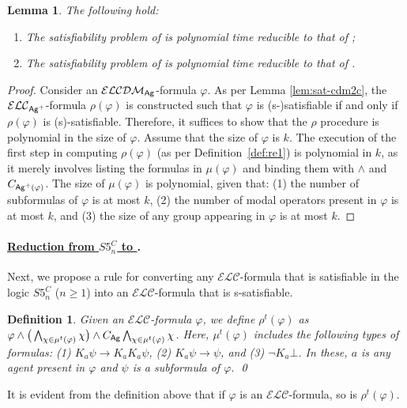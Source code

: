 \documentclass{article}
\newtheorem{definition}[theorem]{Definition}%
\newtheorem{lemma}[theorem]{Lemma}%
\newcommand{\ag}{\text{\normalfont\textsf{Ag}}\xspace}
\renewcommand{\phi}{\varphi}
\newcommand{\ra}{\rightarrow}
\newcommand{\langc}{\ensuremath{\mathcal{ELC}}\xspace}
\newcommand{\langcdm}{\ensuremath{\mathcal{ELCDM}}\xspace}
\newcommand{\lc}{\text{\normalfont ELC}\xspace}
\newcommand{\lcdm}{\text{\normalfont ELCDM}\xspace}
\newcommand{\lsc}{\text{\normalfont ELC$^s$}\xspace}
\newcommand{\lscdm}{\text{\normalfont ELCDM$^s$}\xspace}
\begin{document}
\begin{lemma}\label{lem:red-withc}
The following hold:
\begin{enumerate}
\item \label{it:red-cdm2c} The satisfiability problem of \lcdm is polynomial time reducible to that of \lc;
\item \label{it:red-scdm2sc} The satisfiability problem of \lscdm is polynomial time reducible to that of \lsc.
\end{enumerate}
\end{lemma}
\begin{proof}
Consider an $\langcdm_\ag$-formula $\phi$. As per Lemma \ref{lem:sat-cdm2c}, the $\langc_{\ag^+}$-formula $\rho(\phi)$ is constructed such that $\phi$ is (s-)satisfiable if and only if $\rho(\phi)$ is (s)-satisfiable. Therefore, it suffices to show that the $\rho$ procedure is polynomial in the size of $\phi$. Assume that the size of $\phi$ is $k$. The execution of the first step in computing $\rho(\phi)$ (as per Definition~\ref{def:re1}) is polynomial in $k$, as it merely involves listing the formulas in $\mu(\phi)$ and binding them with $\wedge$ and $C_{\ag^+(\phi)}$. The size of $\mu(\phi)$ is polynomial, given that: (1) the number of subformulas of $\phi$ is at most $k$, (2) the number of modal operators present in $\phi$ is at most $k$, and (3) the size of any group appearing in $\phi$ is at most $k$.
\end{proof}

\paragraph{\bfseries \underline{Reduction from $S5^C_n$ to \lsc}.}

Next, we propose a rule for converting any \langc-formula that is satisfiable in the logic $S5^C_n$ ($n \geq 1$) into an \langc-formula that is s-satisfiable.

\begin{definition}\label{def:rewrite-t}
Given an $\langc$-formula $\phi$, we define $\rho^t(\phi)$ as $\phi \wedge \big(\bigwedge_{\chi \in \mu^t(\phi)} \chi \big) \wedge C_{\ag} \bigwedge_{\chi \in \mu^t(\phi)}\chi$. Here, $\mu^t(\phi)$ includes the following types of formulas: (1) $K_a \psi \ra K_a K_a\psi$, (2) $K_a \psi \ra \psi$, and (3) $\neg K_a\bot$. In these, $a$ is any agent present in $\phi$ and $\psi$ is a subformula of $\phi$.
\qed
\end{definition}
It is evident from the definition above that if $\phi$ is an $\langc$-formula, so is $\rho^t (\phi)$.
\end{document}
